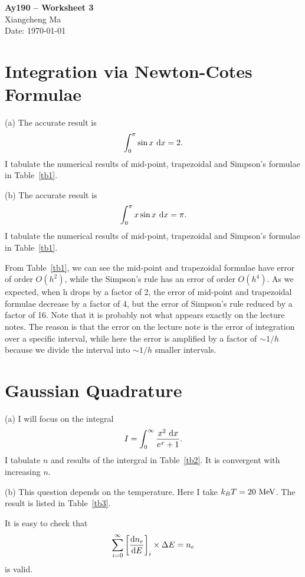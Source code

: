 \documentclass[11pt,letterpaper]{article}
\begin{document}
\begin{center}
\Large
{\bf Ay190 -- Worksheet 3} \\
\large
Xiangcheng Ma \\
Date: \today
\end{center}

\section{Integration via Newton-Cotes Formulae}
(a) The accurate result is
\begin{equation}
  \int_0^{\pi} \sin x~{\rm d}x = 2.
\end{equation}
I tabulate the numerical results of mid-point, trapezoidal and Simpson's formulae in Table~\ref{tb1}.

(b) The accurate result is
\begin{equation}
  \int_0^{\pi} x\sin x~{\rm d}x = \pi .
\end{equation}
I tabulate the numerical results of mid-point, trapezoidal and Simpson's formulae in Table~\ref{tb1}.

From Table~\ref{tb1}, we can see the mid-point and trapezoidal formulae have error of order $O(h^2)$, while the Simpson's rule has an error of order $O(h^4)$. As we expected, when h drops by a factor of 2, the error of mid-point and trapezoidal formulae decrease by a factor of 4, but the error of Simpson's rule reduced by a factor of 16. Note that it is probably not what appears exactly on the lecture notes. The reason is that the error on the lecture note is the error of integration over a specific interval, while here the error is amplified by a factor of $\sim1/h$ because we divide the interval into $\sim1/h$ smaller intervals.



\section{Gaussian Quadrature}
(a) I will focus on the integral
\begin{equation}
  I = \int_0^{\infty} \frac{x^2~{\rm d}x}{e^x+1} .
\end{equation}
I tabulate $n$ and results of the intergral in Table~\ref{tb2}. It is convergent with increasing $n$.


(b) This question depends on the temperature. Here I take $k_B T=20{\rm~MeV}$. The result is listed in Table~\ref{tb3}.

It is easy to check that
\begin{equation}
  \sum_{i=0}^{\infty} \left[\frac{{\rm d}n_e}{{\rm d}E}\right]_i \times \Delta E = n_e
\end{equation}
is valid.
\end{document}
